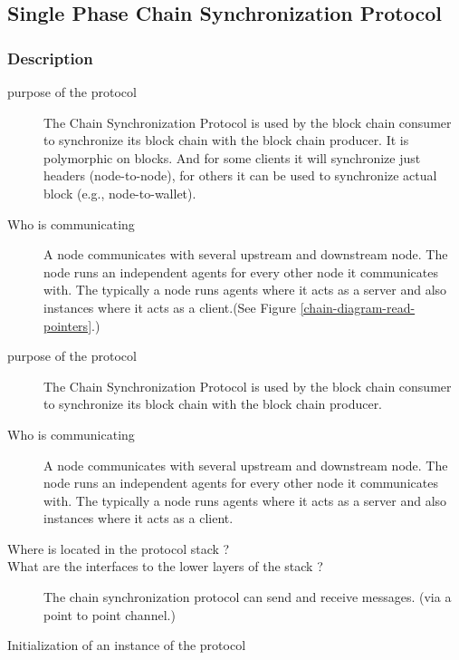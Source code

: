 \documentclass{report}
\theoremstyle{definition}{
  \newtheorem{lemma}{Lemma}[section] %
  \newtheorem{definition}[lemma]{Definition}
}
\theoremstyle{theorem}{
  \newtheorem{invariant}[lemma]{Invariant}
  \newtheorem{proofobligation}[lemma]{Proof Obligation}
}
\numberwithin{equation}{lemma}
\begin{document}
\subsection{Single Phase Chain Synchronization Protocol}
\subsubsection{Description}
\begin{description}
\item[purpose of the protocol]

The Chain Synchronization Protocol is used by the block chain consumer
to synchronize its block chain with the block chain producer.
It is polymorphic on blocks. And for some clients it will synchronize just headers (node-to-node),
for others it can be used to synchronize actual block (e.g., node-to-wallet).

\item[Who is communicating]
  A node communicates with several upstream and downstream node.
  The node runs an independent agents for every other node
  it communicates with. The typically a node runs agents where it acts as a server and also instances
  where it acts as a client.(See Figure \ref{chain-diagram-read-pointers}.)
\end{description}


\begin{description}
\item[purpose of the protocol]
The Chain Synchronization Protocol is used by the block chain consumer
to synchronize its block chain with the block chain producer.
\item[Who is communicating]
  A node communicates with several upstream and downstream node.
  The node runs an independent agents for every other node
  it communicates with. The typically a node runs agents where it acts as a server and also instances
  where it acts as a client.
\item[Where is located in the protocol stack ?]
\item[What are the interfaces to the lower layers of the stack ?]
  The chain synchronization protocol can send and receive messages. (via a point to point channel.)
\item[Initialization of an instance of the protocol]
\end{description}
\end{document}

